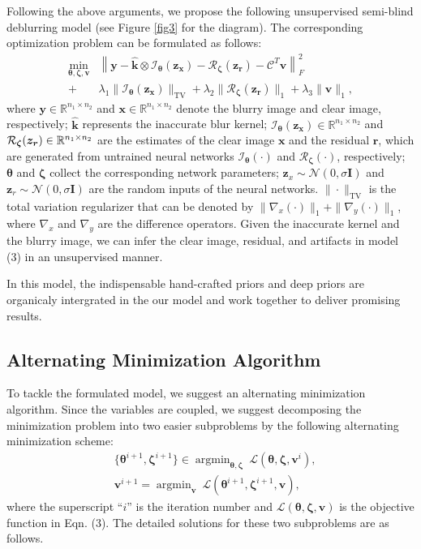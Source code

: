 \documentclass[10pt,twocolumn,letterpaper]{article}
\begin{document}
	Following the above arguments,  we propose the following unsupervised semi-blind deblurring model (see Figure \ref{fig3} for the diagram). The corresponding optimization problem can be formulated as follows:
	\begin{align}
		\mathop{{\min}}_{\bm{\theta},\bm{\zeta},\bm v}&\left\|\bm y-\boldsymbol{\widehat k}\otimes\mathcal I_{\bm\theta}(\bm{z_x})-\mathcal R_{\bm\zeta}(\bm{z_r})-\mathcal C^T\bm v\right\|_F^2	\nonumber\\+&\lambda_1\|\mathcal I_{\bm\theta}(\bm{z_x})\|_{\text{TV}}+\lambda_2\|\mathcal R_{\bm\zeta}(\bm{z_r})\|_1+\lambda_3\|\bm v\|_1,
	\end{align}
	where $\boldsymbol{y}\in\mathbb R^{n_1\times n_2}$ and $\boldsymbol{x}\in\mathbb{R}^{n_1\times n_2}$ denote the blurry image and clear image, respectively; $\boldsymbol{\widehat k}$  represents the inaccurate blur kernel; $\mathcal I_{\bm\theta}(\bm{z_x})\in\mathbb{R}^{n_1\times n_2} $ and ${\cal R}_{\bm \zeta}(\bm z_{\bm r})\in\mathbb{R}^{n_1\times n_2}$ are the  estimates of the clear image $\bm x$ and the residual $\bm r$, which are generated from untrained neural networks $\mathcal I_{\bm\theta}(\cdot)$ and $\mathcal R_{\bm\zeta}(\cdot)$, respectively; $\bm \theta$ and $\bm \zeta$ collect the corresponding network parameters; $\bm z_x\sim \mathcal N(0,\sigma\bm I)$ and $\bm z_r\sim \mathcal N(0,\sigma\bm I)$  are the random inputs of the neural networks. $\|\cdot\|_{\text{TV}}$ is the total variation regularizer that can be denoted by $\|\nabla_{x}(\cdot)\|_{1}+\|\nabla_{y}(\cdot)\|_{1}$, where  $\nabla_x$ and $\nabla_y$  are the difference operators. Given the inaccurate kernel and the blurry image, we can infer the clear image, residual, and artifacts in model (3) in an unsupervised manner.
	
	In this model, the indispensable hand-crafted priors and deep priors are organicaly intergrated in the our model and work together to deliver promising results.
	
	\subsection{Alternating Minimization Algorithm}
	To tackle the formulated model, we suggest an alternating minimization algorithm. Since the variables are coupled, we suggest decomposing the minimization problem into two easier subproblems by the following alternating minimization scheme:
	\begin{align}
		&\{\bm \theta^{i+1},\bm \zeta^{i+1}\} \in\mathop{\arg\min}_{\bm \theta,\bm \zeta}~\mathcal L\left(\bm \theta,\bm \zeta, {\bm  v }^i \right),\\
		&\bm  v ^{i+1} =\mathop{\arg\min}_{ \bm  v}~\mathcal L\left(\bm \theta^{i+1},\bm  \zeta^{i+1}, \bm v \right), 
		\label{eq:Yupdate}
	\end{align}
	where the superscript ``$i$'' is the iteration number and $\mathcal L(\bm\theta, \bm\zeta, \bm v)$ is the objective function in Eqn. (3). The detailed solutions for these two subproblems are as follows.
	
\end{document}
